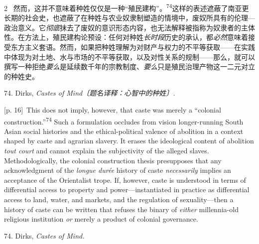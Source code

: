 \documentclass[10pt,a4paper]{article}
\begin{document}
\begin{paracol}{2}
\switchcolumn*
{\scriptsize\color{gray} [p. 16]}\ 然而，这并不意味着种姓仅仅是一种“殖民建构”。\nobreak\textsuperscript{74}这样的表述遮蔽了南亚更长期的社会史，也遮蔽了在种姓与农业奴隶制塑造的情境中，废奴所具有的伦理—政治意义。它\textit{彻底}抹去了废奴的意识形态内容，也无法解释被指称为奴隶者的主体性。在方法上，殖民建构论预设：任何对种姓\textit{长时段}历史的承认，都\textit{必然}意味着接受东方主义套语。然而，如果把种姓理解为对财产与权力的不平等获取——在实践中体现为对土地、水与市场的不平等获取，以及对性关系的规制——那么，就可以撰写一种拒绝\textit{要么}是延续数千年的宗教制度、\textit{要么}只是殖民治理产物这一二元对立的种姓史。\par{\small 74. Dirks, \textit{Castes of Mind〔题名译释：心智中的种姓〕.}\par}
\switchcolumn
{\scriptsize\color{gray} [p. 16]}\ This does not imply, however, that caste was merely a “colonial construction.”\nobreak\textsuperscript{74} Such a formulation occludes from vision longer-running South Asian social histories and the ethical-political valence of abolition in a context shaped by caste and agrarian slavery. It erases the ideological content of abolition \textit{tout court} and cannot explain the subjectivity of the alleged slaves. Methodologically, the colonial construction thesis presupposes that any acknowledgment of the \textit{longue durée} history of caste \textit{necessarily} implies an acceptance of the Orientalist trope. If, however, caste is understood in terms of differential access to property and power—instantiated in practice as differential access to land, water, and markets, and the regulation of sexuality—then a history of caste can be written that refuses the binary of \textit{either} millennia-old religious institution \textit{or} merely a product of colonial governance.\par{\small 74. Dirks, \textit{Castes of Mind.}\par}
\switchcolumn*

\end{paracol}
\end{document}
